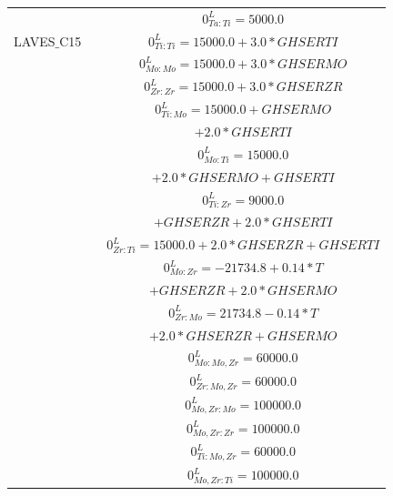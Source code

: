 \begin{longtable}[H]{ c c c }
                              & \cite{Ansara1998} & $0^\textit{L}_{Ta:Ti} = 5000.0$\\
       LAVES$\_$C15 & \cite{Kar2008} & $0^\textit{L}_{Ti:Ti} = 15000.0+3.0*GHSERTI$\\
                               & \cite{Perez2003} & $0^\textit{L}_{Mo:Mo} = 15000.0+3.0*GHSERMO$\\
                               & \cite{Perez2003}  & $0^\textit{L}_{Zr:Zr} = 15000.0+3.0*GHSERZR$\\
                               & \cite{Kar2008} & $0^\textit{L}_{Ti:Mo} = 15000.0+GHSERMO$\\
                               &                        & $+2.0*GHSERTI$\\
                               & \cite{Kar2008} & $0^\textit{L}_{Mo:Ti} = 15000.0$\\
                               &                        & $+2.0*GHSERMO+GHSERTI$\\
                               & \cite{Kar2008} & $0^\textit{L}_{Ti:Zr} = 9000.0$\\
                               &                        & $+GHSERZR+2.0*GHSERTI$\\
                               & \cite{Kar2008} & $0^\textit{L}_{Zr:Ti} = 15000.0+2.0*GHSERZR+GHSERTI$\\
                               & \cite{Perez2003}  & $0^\textit{L}_{Mo:Zr} = -21734.8+0.14*T$\\
                               &                             & $+GHSERZR+2.0*GHSERMO$\\
                               & \cite{Perez2003}  & $0^\textit{L}_{Zr:Mo} = 21734.8-0.14*T$\\
                               &                             & $+2.0*GHSERZR+GHSERMO$\\
                               & \cite{Perez2003} & $0^\textit{L}_{Mo:Mo,Zr} = 60000.0$\\
                               & \cite{Perez2003} & $0^\textit{L}_{Zr:Mo,Zr} = 60000.0$\\
                               & \cite{Perez2003}  & $0^\textit{L}_{Mo,Zr:Mo} = 100000.0$\\
                               & \cite{Perez2003}  & $0^\textit{L}_{Mo,Zr:Zr} = 100000.0$\\
                               & \cite{Kar2008} & $0^\textit{L}_{Ti:Mo,Zr} = 60000.0$\\
                               & \cite{Kar2008} & $0^\textit{L}_{Mo,Zr:Ti} = 100000.0$\\

\end{longtable}
